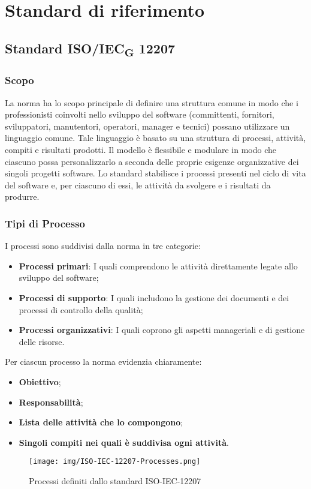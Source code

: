 \appendix
\section{Standard di riferimento}
\subsection{Standard ISO/IEC\textsubscript{G} 12207}
\subsubsection{Scopo}
La norma ha lo scopo principale di definire una struttura comune in modo che i professionisti coinvolti nello sviluppo del software (committenti, fornitori, sviluppatori, manutentori, operatori, manager e tecnici) possano utilizzare un linguaggio comune. Tale linguaggio è basato su una struttura di processi, attività, compiti e risultati prodotti. Il modello è flessibile e modulare in modo che ciascuno possa personalizzarlo a seconda delle proprie esigenze organizzative dei singoli progetti software.
Lo standard stabilisce i processi presenti nel ciclo di vita del software e, per ciascuno di essi, le attività da svolgere e i risultati da produrre.
\subsubsection{Tipi di Processo}
I processi sono suddivisi dalla norma in tre categorie:
\begin{itemize}
	\item \textbf{Processi primari}: I quali comprendono le attività direttamente legate allo sviluppo del software;
	\item \textbf{Processi di supporto}: I quali includono la gestione dei documenti e dei processi di controllo della qualità;
	\item \textbf{Processi organizzativi}: I quali coprono gli aspetti manageriali e di gestione delle risorse.
\end{itemize}
Per ciascun processo la norma evidenzia chiaramente:
\begin{itemize}
	\item \textbf{Obiettivo};
	\item \textbf{Responsabilità};
	\item \textbf{Lista delle attività che lo compongono};
	\item \textbf{Singoli compiti nei quali è suddivisa ogni attività}.
\end{itemize}
\begin{figure}[!ht]
	\centering
	\texttt{[image: img/ISO-IEC-12207-Processes.png]}
	\caption{Processi definiti dallo standard ISO-IEC-12207}
\end{figure}
\newpage
